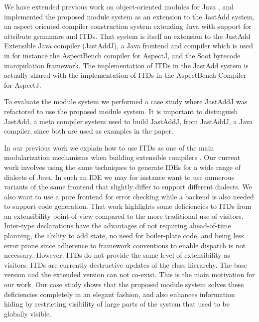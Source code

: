 
We have extended previous work on object-oriented modules for Java \cite{modulesastypes}, 
and implemented the proposed module system as an extension to the 
Jast\-Add system, an aspect oriented compiler construction system 
extending Java with support for attribute grammars and ITDs. That system is itself an extension 
to the Jast\-Add Extensible Java compiler (Jast\-AddJ), a Java frontend and compiler
which is used in for instance the AspectBench compiler for AspectJ, and the 
Soot bytecode manipulation framework. The implementation of ITDs in the JastAdd
system is actually shared with the implementation of ITDs in the
AspectBench Compiler for AspectJ. 

To evaluate the module system we performed a case study where JastAddJ was 
refactored to use the proposed module system. It is important to 
distinguish JastAdd, a meta compiler system used to build JastAddJ, from JastAddJ, a Java 
compiler, since both are used as examples in the paper.

In our previous work we explain how to use ITDs as one of the main
modularization mechanisms when building extensible compilers \cite{aosd08abc}. Our current
work involves using the same techniques to generate IDEs for a wide range
of dialects of Java. In such an IDE we may for instance want to use numerous variants of the
same frontend that slightly differ to support different dialects. We also
want to use a pure frontend for error checking while a backend is also
needed to support code generation.
That work highlights some deficiencies to ITDs from an extensibility point of
view compared to the more traditional use of visitors.
Inter-type declarations have the advantages of not requiring ahead-of-time 
planning, the ability to add state, no need for boiler-plate code, and 
being less error prone since adherence to framework 
conventions to enable dispatch is not necessary.
However, ITDs do not provide the same level of extensibility as visitors.
ITDs are currently destructive updates of the class hierarchy. The base version and the
extended version can not co-exist. This is the main motivation for our
work. 
Our case study shows that the proposed module system solves these deficiencies completely in an
elegant fashion, and also enhances information hiding by restricting 
visibility of large parts of the system that used to be globally visible.

